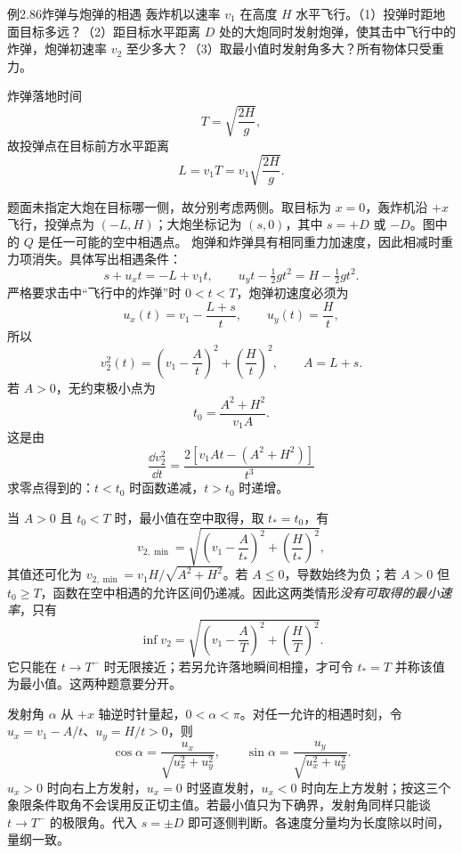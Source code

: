 \begin{origexamplebox}{例2.86\quad 炸弹与炮弹的相遇}
轰炸机以速率 $v_1$ 在高度 $H$ 水平飞行。（1）投弹时距地面目标多远？（2）距目标水平距离 $D$ 处的大炮同时发射炮弹，使其击中飞行中的炸弹，炮弹初速率 $v_2$ 至少多大？（3）取最小值时发射角多大？所有物体只受重力。
\end{origexamplebox}
\begin{xesolution}
炸弹落地时间
\[
T=\sqrt{\frac{2H}{g}},
\]
故投弹点在目标前方水平距离
\[
\boxed{L=v_1T=v_1\sqrt{\frac{2H}{g}}}.
\]

题面未指定大炮在目标哪一侧，故分别考虑两侧。取目标为 $x=0$，轰炸机沿 $+x$ 飞行，投弹点为 $(-L,H)$；大炮坐标记为 $(s,0)$，其中 $s=+D$ 或 $-D$。图中的 $Q$ 是任一可能的空中相遇点。
\BombInterceptDiagram
炮弹和炸弹具有相同重力加速度，因此相减时重力项消失。具体写出相遇条件：
\[
s+u_xt=-L+v_1t,\qquad
u_yt-\tfrac12gt^2=H-\tfrac12gt^2.
\]
严格要求击中“飞行中的炸弹”时 $0<t<T$，炮弹初速度必须为
\[
u_x(t)=v_1-\frac{L+s}{t},\qquad u_y(t)=\frac Ht,
\]
所以
\[
v_2^2(t)=\left(v_1-\frac{A}{t}\right)^2+\left(\frac Ht\right)^2,
\qquad A=L+s.
\]
若 $A>0$，无约束极小点为
\[
t_0=\frac{A^2+H^2}{v_1A}.
\]
这是由
\[
\frac{\dd v_2^2}{\dd t}
=\frac{2[v_1At-(A^2+H^2)]}{t^3}
\]
求零点得到的：$t<t_0$ 时函数递减，$t>t_0$ 时递增。

当 $A>0$ 且 $t_0<T$ 时，最小值在空中取得，取 $t_*=t_0$，有
\[
\boxed{v_{2,\min}=\sqrt{\left(v_1-\frac{A}{t_*}\right)^2+\left(\frac H{t_*}\right)^2}},
\]
其值还可化为 $v_{2,\min}=v_1H/\sqrt{A^2+H^2}$。若 $A\le0$，导数始终为负；若 $A>0$ 但 $t_0\ge T$，函数在空中相遇的允许区间仍递减。因此这两类情形\emph{没有可取得的最小速率}，只有
\[
\boxed{\inf v_2=\sqrt{\left(v_1-\frac A T\right)^2+\left(\frac H T\right)^2}}.
\]
它只能在 $t\to T^-$ 时无限接近；若另允许落地瞬间相撞，才可令 $t_*=T$ 并称该值为最小值。这两种题意要分开。

发射角 $\alpha$ 从 $+x$ 轴逆时针量起，$0<\alpha<\pi$。对任一允许的相遇时刻，令 $u_x=v_1-A/t$、$u_y=H/t>0$，则
\[
\cos\alpha=\frac{u_x}{\sqrt{u_x^2+u_y^2}},\qquad
\sin\alpha=\frac{u_y}{\sqrt{u_x^2+u_y^2}}.
\]
$u_x>0$ 时向右上方发射，$u_x=0$ 时竖直发射，$u_x<0$ 时向左上方发射；按这三个象限条件取角不会误用反正切主值。若最小值只为下确界，发射角同样只能谈 $t\to T^-$ 的极限角。代入 $s=\pm D$ 即可逐侧判断。各速度分量均为长度除以时间，量纲一致。
\end{xesolution}

